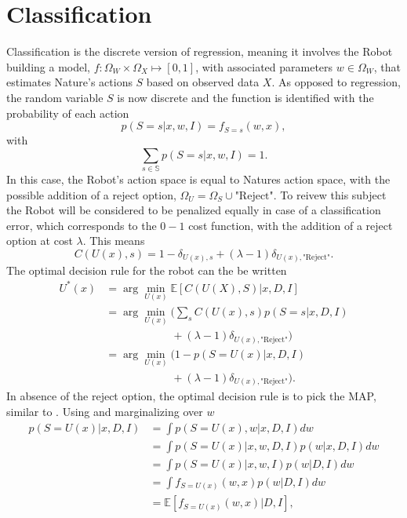 \chapter{Classification}
\label{chp:baycl}
Classification is the discrete version of regression, meaning it involves the Robot building a model, $f: \Omega_W\times \Omega_X\mapsto[0,1]$, with associated parameters $w\in \Omega_W$, that estimates Nature's actions $S$ based on observed data $X$. As opposed to regression, the random variable $S$ is now discrete and the function is identified with the probability of each action
\begin{equation}
	p(S = s|x,w,I)= f_{S = s}(w,x),
	\label{f_dist2}
\end{equation}
with
\begin{equation}
	\sum_{s\in\mathbb{S}} p(S = s|x,w,I) = 1.
\end{equation}
In this case, the Robot's action space is equal to Natures action space, with the possible addition of a reject option, $\Omega_U=\Omega_S\cup \text{"Reject"}$. To reivew this subject the Robot will be considered to be penalized equally in case of a classification error, which corresponds to the $0-1$ cost function, with the addition of a reject option at cost $\lambda$. This means
\begin{equation}
	C(U(x),s) = 1- \delta_{U(x),s}+(\lambda-1)\delta_{U(x),\text{"Reject"}}.
\end{equation}
The optimal decision rule for the robot can the be written
\begin{equation}
	\begin{split}
		U^*(x) & = \arg\min_{U(x)}\mathbb{E}[C(U(X), S)|x,D,I]\\
		&= \arg\min_{U(x)}\bigg(\sum_{s}C(U(x),s)p(S = s|x,D,I)\\
		&\qquad\qquad\qquad+(\lambda-1)\delta_{U(x),\text{"Reject"}}\bigg)\\
		& = \arg\min_{U(x)}\bigg(1- p(S=U(x)|x,D,I)\\
		&\qquad\qquad\qquad+(\lambda-1)\delta_{U(x),\text{"Reject"}}\bigg).
	\end{split}
	\label{eq:expected_cost1}
\end{equation}
In absence of the reject option, the optimal decision rule is to pick the MAP, similar to . Using  and marginalizing over $w$
\begin{equation}
	\begin{split}
		p(S= U(x)|x,D,I) &= \int p(S = U(x),w|x,D,I) dw \\
		& = \int p(S = U(x)|x,w,D,I)  p(w|x,D,I)dw \\
		& = \int p(S = U(x)|x,w,I)  p(w|D,I)dw \\
		& = \int f_{S = U(x)}(w,x)  p(w|D,I)dw \\
		& = \mathbb{E}[f_{S = U(x)}(w,x)|D,I],\\
	\end{split}
	\label{eq:q5}
\end{equation}
